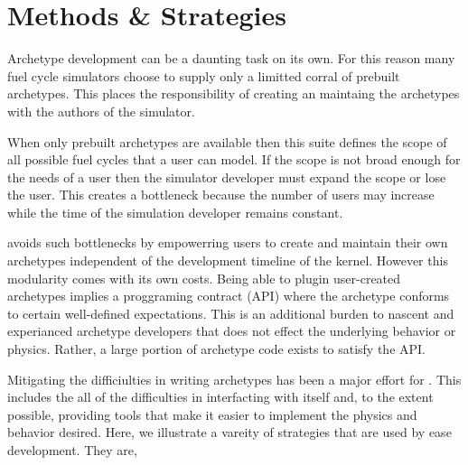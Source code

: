 \section{Methods \& Strategies}
\label{sec-methods}

Archetype development can be a daunting task on its own. For this reason 
many fuel cycle simulators choose to supply only a limitted corral of 
prebuilt archetypes. This places the responsibility of creating an maintaing 
the archetypes with the authors of the simulator.

When only prebuilt archetypes are available then this suite defines the scope 
of all possible fuel cycles that a user can model. If the scope is not broad 
enough for the needs of a user then the simulator developer  must expand the 
scope or lose the user.  This creates a bottleneck because the number of users 
may increase while the time of the simulation developer remains constant.

\Cyclus avoids such bottlenecks by empowerring users to create and maintain 
their own archetypes independent of the development timeline of the \cyclus 
kernel. However this modularity comes with its own costs. Being able to 
plugin user-created archetypes implies a proggraming contract (API) where 
the archetype conforms to certain well-defined expectations. This is an 
additional burden to nascent and experianced archetype developers that 
does not effect the underlying behavior or physics. Rather, a large portion 
of archetype code exists to satisfy the \cyclus API.

Mitigating the difficiulties in writing archetypes has been a major effort 
for \cyclus. This includes the all of the difficulties in interfacting with 
\cyclus itself and, to the extent possible, providing tools that make it 
easier to implement the physics and behavior desired. Here, we illustrate 
a vareity of strategies that are used by \cyclus ease development. They are, 


